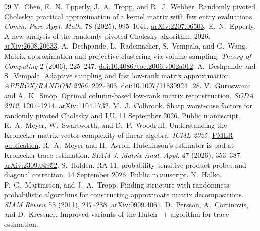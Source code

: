 \documentclass[11pt,a4paper]{article}
\begin{document}
\clearpage
\begingroup
\small
\begin{thebibliography}{99}
\setlength{\itemsep}{3pt}
\setlength{\parsep}{0pt}
 Y.~Chen, E.~N.~Epperly, J.~A.~Tropp, and R.~J.~Webber.
Randomly pivoted Cholesky: practical approximation of a kernel matrix with
few entry evaluations. \emph{Comm. Pure Appl. Math.} 78 (2025), 995--1041.
\href{https://arxiv.org/abs/2207.06503}{arXiv:2207.06503}.
 E.~N.~Epperly. A new analysis of the randomly pivoted
Cholesky algorithm. 2026.
\href{https://arxiv.org/abs/2608.20633}{arXiv:2608.20633}.
 A.~Deshpande, L.~Rademacher, S.~Vempala, and G.~Wang.
Matrix approximation and projective clustering via volume sampling.
\emph{Theory of Computing} 2 (2006), 225--247.
\href{https://doi.org/10.4086/toc.2006.v002a012}{doi:10.4086/toc.2006.v002a012}.
 A.~Deshpande and S.~Vempala. Adaptive sampling and fast low-rank
matrix approximation. \emph{APPROX/RANDOM 2006}, 292--303.
\href{https://doi.org/10.1007/11830924_28}{doi:10.1007/11830924\_28}.
 V.~Guruswami and A.~K.~Sinop. Optimal column-based low-rank
matrix reconstruction. \emph{SODA 2012}, 1207--1214.
\href{https://arxiv.org/abs/1104.1732}{arXiv:1104.1732}.
 M.~J.~Colbrook. Sharp worst-case factors for randomly
pivoted Cholesky and LU.
11 September 2026.
\href{https://github.com/ajt60gaibb/OpenProblemsInNLA/blob/main/references/colbrook-random-pivoting-2026-09-11/manuscripts/sharp_random_pivoting.pdf}{Public manuscript}.
 R.~A.~Meyer, W.~Swartworth, and D.~P.~Woodruff. Understanding
the Kronecker matrix-vector complexity of linear algebra. \emph{ICML 2025}.
\href{https://proceedings.mlr.press/v267/meyer25a.html}{PMLR publication}.
 R.~A.~Meyer and H.~Avron. Hutchinson's estimator is bad at
Kronecker-trace-estimation. \emph{SIAM J. Matrix Anal. Appl.} 47 (2026),
353--387. \href{https://arxiv.org/abs/2309.04952}{arXiv:2309.04952}.
 S.~Holden. RA-11: probability-sensitive product probes and
diagonal correction. 14 September 2026.
\href{https://github.com/ajt60gaibb/OpenProblemsInNLA/blob/main/references/holden-further-2026-09-14/RA-11/manuscript.md}{Public manuscript}.
 N.~Halko, P.~G.~Martinsson, and J.~A.~Tropp. Finding structure
with randomness: probabilistic algorithms for constructing approximate
matrix decompositions. \emph{SIAM Review} 53 (2011), 217--288.
\href{https://arxiv.org/abs/0909.4061}{arXiv:0909.4061}.
 D.~Persson, A.~Cortinovis, and D.~Kressner. Improved
variants of the Hutch++ algorithm for trace estimation.

\end{thebibliography}
\end{document}
